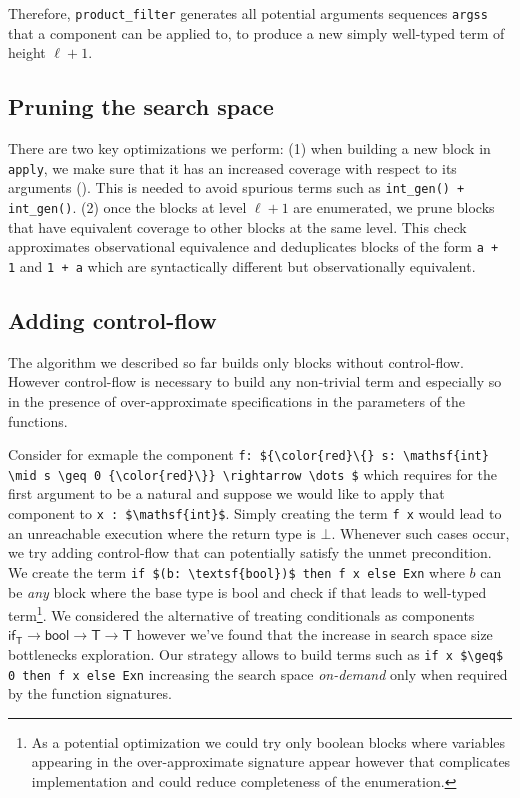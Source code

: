 \documentclass[review, sigplan]{acmart}
\begin{document}
Therefore, \lstinline[basicstyle=\small\ttfamily]|product_filter|
generates all potential arguments sequences \lstinline[basicstyle=\small\ttfamily]|argss|
that a component can be applied to, to produce a new simply well-typed
term of height $\ell + 1$.

\subsection{Pruning the search space}
There are two key optimizations we perform:
(1) when building a new block in \lstinline[basicstyle=\small\ttfamily]|apply|,
we make sure that it has an increased coverage with respect to its arguments ().
This is needed to avoid spurious terms such as
\lstinline[basicstyle=\small\ttfamily]|int_gen() + int_gen()|.
(2) once the blocks at level $\ell + 1$ are enumerated,
we prune blocks that have equivalent coverage to other blocks at the same
level.
This check approximates observational equivalence and deduplicates
blocks of the form \lstinline[basicstyle=\small\ttfamily]|a + 1|
and \lstinline[basicstyle=\small\ttfamily]|1 + a| which are
syntactically different but observationally equivalent.

\subsection{Adding control-flow}

The algorithm we described so far builds only blocks without
control-flow.
However control-flow is necessary to build any non-trivial term and
especially so in the presence of over-approximate specifications
in the parameters of the functions.

Consider for exmaple the component
\lstinline[basicstyle=\small\ttfamily, mathescape]|f: ${\color{red}\{} s: \mathsf{int} \mid s \geq 0 {\color{red}\}} \rightarrow \dots $|
which requires for the first argument to be a natural and suppose
we would like to apply that component to \lstinline[basicstyle=\small\ttfamily, mathescape]|x : $\mathsf{int}$|.
Simply creating the term \lstinline[language=caml, basicstyle=\small\ttfamily, mathescape]|f x|
would lead to an unreachable execution where the return type is $\bot$.
Whenever such cases occur, we try adding control-flow that can potentially
satisfy the unmet precondition.
We create the term \lstinline[language=caml, basicstyle=\small\ttfamily, mathescape]|if $(b: \textsf{bool})$ then f x else Exn|
where $b$ can be \emph{any} block where the base type is \textsf{bool}
and check if that leads to well-typed term\footnote{
As a potential optimization we could try only boolean blocks where
variables appearing in the over-approximate signature appear however
that complicates implementation and could reduce completeness of the
enumeration.}.
We considered the alternative of treating conditionals as components
$\textsf{if}_\textsf{T} \rightarrow \textsf{bool} \rightarrow \textsf{T} \rightarrow \textsf{T}$
however we've found that the increase in search space size
bottlenecks exploration.
Our strategy allows to build terms such as
\lstinline[language=caml, basicstyle=\small\ttfamily, mathescape]|if x $\geq$ 0 then f x else Exn|
increasing the search space \emph{on-demand} only when required
by the function signatures.
\end{document}
